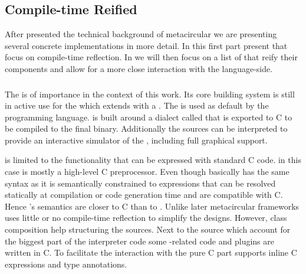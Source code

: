 \subsection{Compile-time Reified \VMs}
After presented the technical background of metacircular \VMs we are presenting several concrete implementations in more detail.
In this first part present \VMs that focus on compile-time reflection.
In  we will then focus on a list of \VMs that reify their components and allow for a more close interaction with the language-side.


\subsubsection*{\Squeak \ST \VM}
The \Squeak \VM\cite{Inga97a} is of importance in the context of this work.
Its core building system is still in active use for the  which extends \Squeak with a \JIT.
The \Cog \VM is used as default by the  programming language.
\Squeak is built around a \ST dialect called \Slang that is exported to C to be compiled to the final \VM binary.
Additionally the \Slang sources can be interpreted to provide an interactive simulator of the \VM, including full graphical support.

\Slang is limited to the functionality that can be expressed with standard C code.
\Slang in this case is mostly a high-level C preprocessor.
Even though \Slang basically has the same syntax as \ST it is semantically constrained to expressions that can be resolved statically at compilation or code generation time and are compatible with C.
Hence \Slang's semantics are closer to C than to \ST.
Unlike later metacircular frameworks \Squeak uses little or no compile-time reflection to simplify the \VM designs.
However, class composition help structuring the sources.
Next to the \Slang source which account for the biggest part of the interpreter code some \OS-related code and plugins are written in C.
To facilitate the interaction with the pure C part \Slang supports inline C expressions and type annotations.

